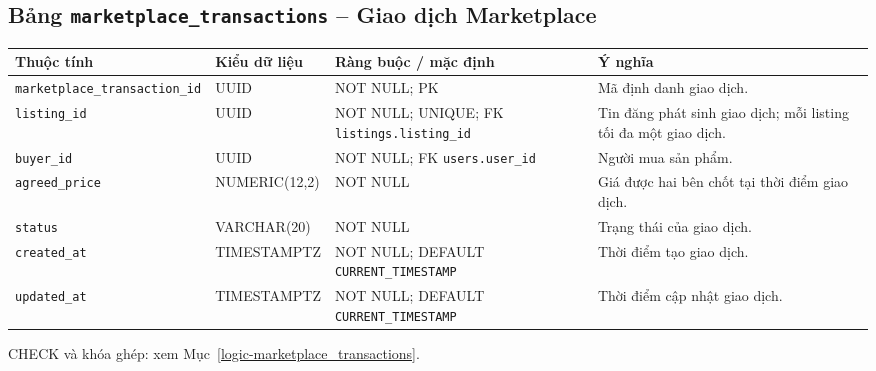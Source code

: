 \subsection{Bảng \texttt{marketplace\_\allowbreak{}transactions} -- Giao dịch Marketplace}
\label{dictionary-marketplace_transactions}
\begingroup
\footnotesize
\setlength{\tabcolsep}{3pt}
\begin{longtable}{>{\raggedright\arraybackslash}p{3.1cm}>{\raggedright\arraybackslash}p{2.5cm}>{\raggedright\arraybackslash}p{3.7cm}>{\raggedright\arraybackslash}p{4.3cm}}
\toprule
Thuộc tính & Kiểu dữ liệu & Ràng buộc / mặc định & Ý nghĩa \\
\midrule
\endhead
\texttt{marketplace\_\allowbreak{}transaction\_\allowbreak{}id} & UUID & NOT NULL; PK & Mã định danh giao dịch. \\
\texttt{listing\_\allowbreak{}id} & UUID & NOT NULL; UNIQUE; FK \texttt{listings.listing\_\allowbreak{}id} & Tin đăng phát sinh giao dịch; mỗi listing tối đa một giao dịch. \\
\texttt{buyer\_\allowbreak{}id} & UUID & NOT NULL; FK \texttt{users.user\_\allowbreak{}id} & Người mua sản phẩm. \\
\texttt{agreed\_\allowbreak{}price} & NUMERIC(12,2) & NOT NULL & Giá được hai bên chốt tại thời điểm giao dịch. \\
\texttt{status} & VARCHAR(20) & NOT NULL & Trạng thái của giao dịch. \\
\texttt{created\_\allowbreak{}at} & TIMESTAMPTZ & NOT NULL; DEFAULT \texttt{CURRENT\_\allowbreak{}TIMESTAMP} & Thời điểm tạo giao dịch. \\
\texttt{updated\_\allowbreak{}at} & TIMESTAMPTZ & NOT NULL; DEFAULT \texttt{CURRENT\_\allowbreak{}TIMESTAMP} & Thời điểm cập nhật giao dịch. \\
\bottomrule
\end{longtable}
\endgroup
CHECK và khóa ghép: xem Mục~\ref{logic-marketplace_transactions}.
